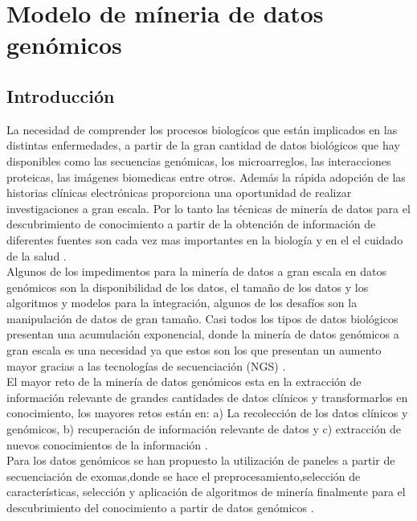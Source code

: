 \chapter{Modelo de míneria de datos genómicos}

\section{Introducción}

La necesidad de comprender los procesos biologícos que están implicados en las distintas enfermedades, a partir de la gran cantidad de datos biológicos que hay disponibles como las secuencias genómicas, los microarreglos, las interacciones proteicas, las imágenes biomedicas entre otros. Además la rápida adopción de las historias clínicas electrónicas proporciona una oportunidad de realizar investigaciones a gran escala. Por lo tanto las técnicas de minería de datos para el descubrimiento de conocimiento a partir de la obtención de información de diferentes fuentes son cada vez mas importantes en la biología y en el el cuidado de la salud \cite{Wang2017}.\\

Algunos de los impedimentos para la minería de datos a gran escala en datos genómicos son la disponibilidad de los datos, el tamaño de los datos y los algoritmos y modelos para la integración, algunos de los desafíos son la manipulación de datos de gran tamaño. Casi todos los tipos de datos biológicos presentan una acumulación exponencial, donde la minería de datos genómicos a gran escala es una necesidad ya que estos son los que presentan un aumento mayor gracias a las tecnologías de secuenciación (NGS) \cite{Huttenhower2010}.\\

El mayor reto de la minería de datos genómicos esta en la extracción de información relevante de grandes cantidades de datos clínicos y transformarlos en conocimiento, los mayores retos están en: a) La recolección de los datos clínicos y genómicos, b) recuperación de información relevante de datos y c) extracción de nuevos conocimientos de la información \cite{Farid2016}. \\  

Para los datos genómicos se han propuesto la utilización de paneles a partir de secuenciación de exomas,donde se hace el preprocesamiento,selección de características, selección y aplicación de algoritmos de minería finalmente para el descubrimiento del conocimiento a partir de datos genómicos \cite{Farid2016}. \\

